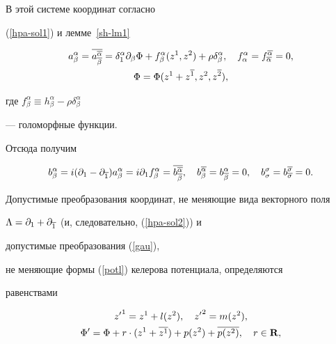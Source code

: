 В этой системе координат согласно


(\ref{hpa-sol1}) и лемме~\ref{sh-lm1}


\begin{gather}


\label{hpa-sol2}


a^\alpha_\beta = \ol{a^{\ol\alpha}_{\ol\beta}} =


\delta^\alpha_1 \pl\beta \Phi + f^\alpha_\beta (z^1,z^2)


+\rho \delta^\alpha_\beta,


\quad f^\alpha_\alpha= f^{\ol\alpha}_{\ol\alpha} = 0,\\


\label{potl}


\Phi = \Phi(z^1 +z^{\ol 1},z^2,z^{\ol 2}),


\end{gather}


где $f^\alpha_\beta \equiv h^\alpha_\beta-\rho \delta^\alpha_\beta$


--- голоморфные функции.


Отсюда получим


\begin{equation}


\label{hpab-sol}


b^\alpha_\beta=i\dmin a^\alpha_\beta = i \pl 1 f^\alpha_\beta =


\ol{b^{\ol\alpha}_{\ol\beta}}, \quad b^{\ol\alpha}_\beta=


b^\alpha_{\ol\beta}=0, \quad


b^\sigma_\sigma=b^{\ol\sigma}_{\ol\sigma}=0.


\end{equation}





Допустимые преобразования координат, не меняющие вида векторного поля


$\Lambda = \partial_1 +\partial_{\overline 1}$ (и, следовательно, (\ref{hpa-sol2})) и


допустимые преобразования (\ref{gau}),


не меняющие формы (\ref{potl}) келерова потенциала, определяются


равенствами


\begin{gather}


\label{free1}


{z'}^1 = z^1+l(z^2), \quad {z'}^2 = m(z^2),\\


\label{free-gau}


\Phi'= \Phi +r\cdot (z^1 + \ol{z^1}) + p(z^2) + \ol{p(z^2)}, \quad r\in


{\bold R},


\end{gather}


